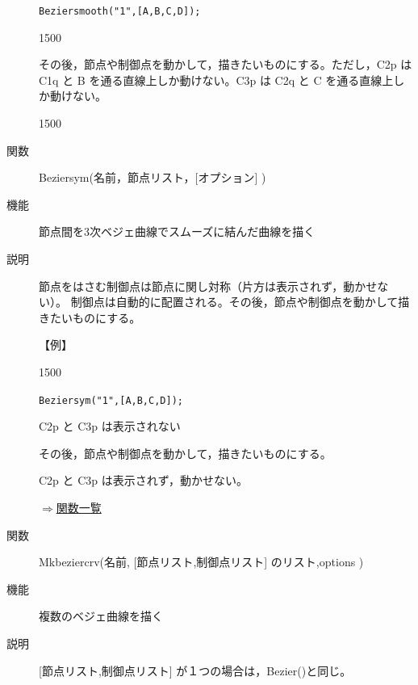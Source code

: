 \documentclass[papersize,a4paper,10pt,uplatex]{jsarticle}
\begin{document}
\begin{description}
\verb|Beziersmooth("1",[A,B,C,D]);|

\begin{layer}{150}{0}
\end{layer}

\vspace{40mm}
その後，節点や制御点を動かして，描きたいものにする。ただし，C2p は C1q と B を通る直線上しか動けない。C3p は C2q と C を通る直線上しか動けない。

\begin{layer}{150}{0}
\end{layer}

\vspace{35mm}

\vspace{\baselineskip}
\hypertarget{beziersym}{}
\item[関数]Beziersym(名前，節点リスト，[オプション] )
\item[機能]節点間を3次ベジェ曲線でスムーズに結んだ曲線を描く
\item[説明]節点をはさむ制御点は節点に関し対称（片方は表示されず，動かせない）。
制御点は自動的に配置される。その後，節点や制御点を動かして描きたいものにする。

\vspace{\baselineskip}
【例】

\begin{layer}{150}{0}
\end{layer}

\verb|Beziersym("1",[A,B,C,D]);|

C2p と C3p は表示されない

\vspace{25mm}

その後，節点や制御点を動かして，描きたいものにする。

C2p と C3p は表示されず，動かせない。

\begin{center}  \end{center}

\begin{flushright}\hyperlink{functionlist}{$\Rightarrow$関数一覧}\end{flushright}
\hypertarget{mkbeziercrv}{}
\item[関数]Mkbeziercrv(名前, [節点リスト,制御点リスト] のリスト,options )
\item[機能]複数のベジェ曲線を描く
\item[説明][節点リスト,制御点リスト] が１つの場合は，Bezier()と同じ。


\end{description}
\end{document}
